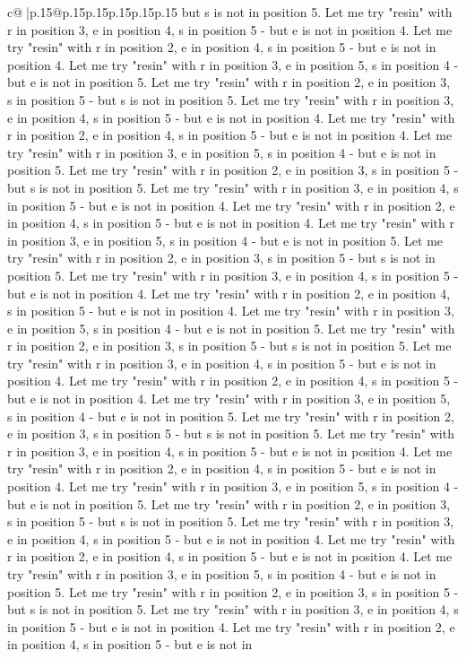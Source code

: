 \documentclass{article}
\begin{document}
{\begin{supertabular}{c@{$\;$}|p{.15\linewidth}@{}p{.15\linewidth}p{.15\linewidth}p{.15\linewidth}p{.15\linewidth}p{.15\linewidth}}
{{{but s is not in position 5. Let me try "resin" with r in position 3, e in position 4, s in position 5 {-} but e is not in position 4. Let me try "resin" with r in position 2, e in position 4, s in position 5 {-} but e is not in position 4. Let me try "resin" with r in position 3, e in position 5, s in position 4 {-} but e is not in position 5. Let me try "resin" with r in position 2, e in position 3, s in position 5 {-} but s is not in position 5. Let me try "resin" with r in position 3, e in position 4, s in position 5 {-} but e is not in position 4. Let me try "resin" with r in position 2, e in position 4, s in position 5 {-} but e is not in position 4. Let me try "resin" with r in position 3, e in position 5, s in position 4 {-} but e is not in position 5. Let me try "resin" with r in position 2, e in position 3, s in position 5 {-} but s is not in position 5. Let me try "resin" with r in position 3, e in position 4, s in position 5 {-} but e is not in position 4. Let me try "resin" with r in position 2, e in position 4, s in position 5 {-} but e is not in position 4. Let me try "resin" with r in position 3, e in position 5, s in position 4 {-} but e is not in position 5. Let me try "resin" with r in position 2, e in position 3, s in position 5 {-} but s is not in position 5. Let me try "resin" with r in position 3, e in position 4, s in position 5 {-} but e is not in position 4. Let me try "resin" with r in position 2, e in position 4, s in position 5 {-} but e is not in position 4. Let me try "resin" with r in position 3, e in position 5, s in position 4 {-} but e is not in position 5. Let me try "resin" with r in position 2, e in position 3, s in position 5 {-} but s is not in position 5. Let me try "resin" with r in position 3, e in position 4, s in position 5 {-} but e is not in position 4. Let me try "resin" with r in position 2, e in position 4, s in position 5 {-} but e is not in position 4. Let me try "resin" with r in position 3, e in position 5, s in position 4 {-} but e is not in position 5. Let me try "resin" with r in position 2, e in position 3, s in position 5 {-} but s is not in position 5. Let me try "resin" with r in position 3, e in position 4, s in position 5 {-} but e is not in position 4. Let me try "resin" with r in position 2, e in position 4, s in position 5 {-} but e is not in position 4. Let me try "resin" with r in position 3, e in position 5, s in position 4 {-} but e is not in position 5. Let me try "resin" with r in position 2, e in position 3, s in position 5 {-} but s is not in position 5. Let me try "resin" with r in position 3, e in position 4, s in position 5 {-} but e is not in position 4. Let me try "resin" with r in position 2, e in position 4, s in position 5 {-} but e is not in position 4. Let me try "resin" with r in position 3, e in position 5, s in position 4 {-} but e is not in position 5. Let me try "resin" with r in position 2, e in position 3, s in position 5 {-} but s is not in position 5. Let me try "resin" with r in position 3, e in position 4, s in position 5 {-} but e is not in position 4. Let me try "resin" with r in position 2, e in position 4, s in position 5 {-} but e is not in }}}
\end{supertabular}}
\end{document}
